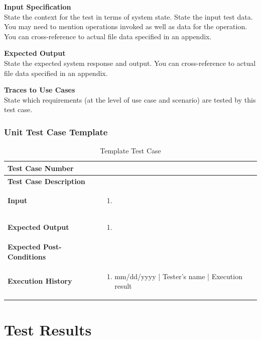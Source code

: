 \documentclass[12pt]{article}
\begin{document}
\noindent
{\bf Input Specification}\\
State the context for the test in terms of system state.
State the input test data. You may need to mention operations invoked as well as data for the operation.
You can cross-reference to actual file data specified in an appendix.

\noindent
{\bf Expected Output}\\
State the expected system response and output.
You can cross-reference to actual file data specified in an appendix.

\noindent
{\bf Traces to Use Cases}\\
State which requirements (at the level of use case and scenario) are tested by this test case.

\subsubsection{Unit Test Case Template}
\def\arraystretch{1.5}%
\begin{table}[htbp]
\centering
\caption{Template Test Case}
\label{UT-X}
\begin{tabularx}{\textwidth}{ | l | X |}
\hline
\textbf{Test Case Number}      &                           \\ \hline
\textbf{Test Case Description}    &                  \\ \hline
\textbf{Input}         & 	\begin{enumerate}
	\item
\end{enumerate} \\ \hline

\textbf{Expected Output}     & \begin{enumerate}
	\item 
\end{enumerate} \\ \hline
\textbf{Expected Post-Conditions}           &                 \\ \hline
\textbf{Execution History}   &  \begin{enumerate}
	\item mm/dd/yyyy | Tester's name | Execution result
\end {enumerate} \\ \hline
\end{tabularx}
\end{table}
\clearpage

\section{Test Results}
\end{document}
